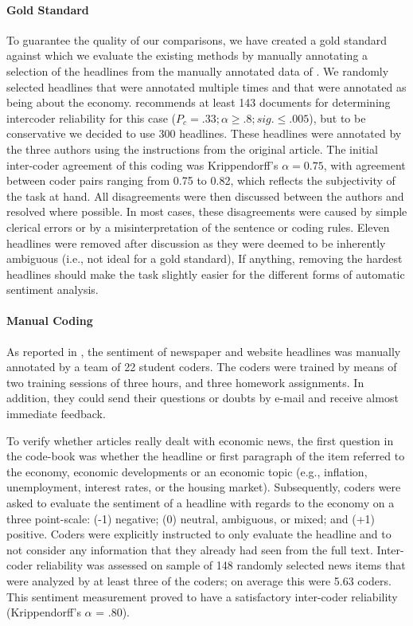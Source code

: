\paragraph{Gold Standard}
To guarantee the quality of our comparisons, we have created a gold standard against which we evaluate the existing methods by manually annotating a selection of the headlines from the manually annotated data of \cite{boukes2019}.
We randomly selected headlines that were annotated multiple times and that were annotated as being about the economy. 
\citet[p.240]{krippendorff12} recommends at least 143 documents for determining intercoder reliability for this case ($P_c =.33;\alpha\geq.8;sig.\leq.005$), but to be conservative we decided to use 300 headlines.
These headlines were annotated by the three authors using the instructions from the original article.
The initial inter-coder agreement of this coding was Krippendorff's $\alpha=0.75$,
with agreement between coder pairs ranging from 0.75 to 0.82, which reflects the subjectivity of the task at hand. 
All disagreements were then discussed between the authors and resolved where possible.
In most cases, these disagreements were caused by simple clerical errors or by a misinterpretation of the sentence or coding rules. 
Eleven headlines were removed after discussion as they were deemed to be inherently ambiguous (i.e., not ideal for a gold standard),
If anything, removing the hardest headlines should make the task slightly easier for the different forms of automatic sentiment analysis. 

\paragraph{Manual Coding}
As reported in \citet{boukes2019}, the sentiment of newspaper and website headlines was manually annotated by a team of 22 student coders. 
The coders were trained by means of two training sessions of three hours, and three homework assignments. 
In addition, they could send their questions or doubts by e-mail and receive almost immediate feedback. 

To verify whether articles really dealt with economic news, the first question in the code-book was whether the headline or first paragraph of the item referred to the economy, economic developments or an economic topic (e.g., inflation, unemployment, interest rates, or the housing market). 
Subsequently, coders were asked to evaluate the sentiment of a headline with regards to the economy on a three point-scale: (-1) negative; (0) neutral, ambiguous, or mixed; and (+1) positive. 
Coders were explicitly instructed to only evaluate the headline and to not consider any information that they already had seen from the full text. 
Inter-coder reliability was assessed on sample of 148 randomly selected news items that were analyzed by at least three of the coders; on average this were 5.63 coders. This sentiment measurement proved to have a satisfactory inter-coder reliability (Krippendorff's $\alpha$ = .80).

